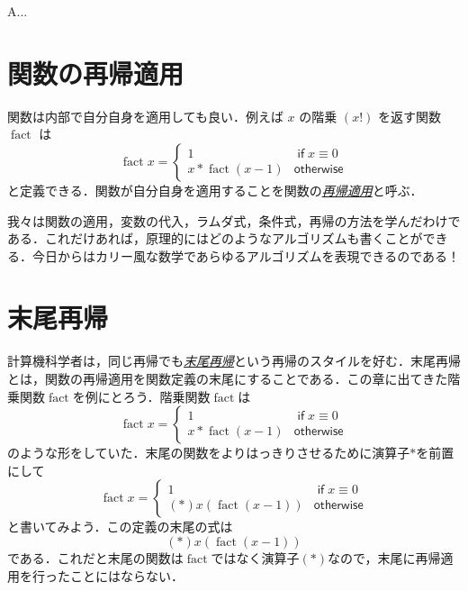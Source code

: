 \documentclass[a4paper]{jsbook}
\newenvironment{leader}{\begingroup}{\endgroup}
\newcommand{\keyword}[1]{{\underline{\emph{#1}}}}
\DeclareMathOperator{\mathFactorial}{fact}
\newcommand{\mathKeyword}[1]{\operatorname{\textsf{#1}}}
\newcommand{\mathIf}{\mathKeyword{if}}
\newcommand{\mathOtherwise}{\mathKeyword{otherwise}}
\begin{document}
\begin{leader}
A...
\end{leader}


\section{関数の再帰適用}

関数は内部で自分自身を適用しても良い．例えば $x$ の階乗 $(x!)$ を返す関数 $\mathFactorial$ は
\begin{equation}
\mathFactorial x=\begin{cases}
1&\mathIf x\equiv0\\
x*\mathFactorial(x-1)&\mathOtherwise
\end{cases}
\end{equation}
と定義できる．関数が自分自身を適用することを関数の\keyword{再帰適用}と呼ぶ．

我々は関数の適用，変数の代入，ラムダ式，条件式，再帰の方法を学んだわけである．これだけあれば，原理的にはどのようなアルゴリズムも書くことができる．今日からはカリー風な数学であらゆるアルゴリズムを表現できるのである！

\section{末尾再帰}

計算機科学者は，同じ再帰でも\keyword{末尾再帰}という再帰のスタイルを好む．末尾再帰とは，関数の再帰適用を関数定義の末尾にすることである．この章に出てきた階乗関数$\mathFactorial$を例にとろう．階乗関数$\mathFactorial$は
\begin{equation}
\mathFactorial x=\begin{cases}
1&\mathIf x\equiv0\\
x*\mathFactorial(x-1)&\mathOtherwise
\end{cases}
\end{equation}
のような形をしていた．末尾の関数をよりはっきりさせるために演算子$*$を前置にして
\begin{equation}
\mathFactorial x=\begin{cases}
1&\mathIf x\equiv0\\
(*)x(\mathFactorial(x-1))&\mathOtherwise
\end{cases}
\end{equation}
と書いてみよう．この定義の末尾の式は
\begin{equation}
(*)x(\mathFactorial(x-1))
\end{equation}
である．これだと末尾の関数は$\mathFactorial$ではなく演算子$(*)$なので，末尾に再帰適用を行ったことにはならない．
\end{document}
